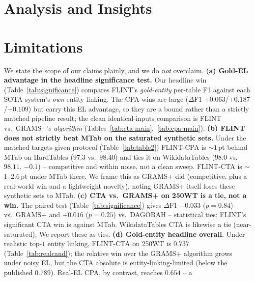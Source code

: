 \documentclass[11pt]{article}
\begin{document}
\section{Analysis and Insights}
\label{sec:analysis}





\section{Limitations}
\label{sec:limitations}
We state the scope of our claims plainly, and we do \emph{not} overclaim.
\textbf{(a) Gold-EL advantage in the headline significance test.} Our headline win
(Table~\ref{tab:significance}) compares FLINT's \emph{gold-entity} per-table F1 against
each SOTA system's \emph{own} entity linking. The CPA wins are large ($\Delta$F1
$+0.063$/$+0.187$/$+0.109$) but carry this EL advantage, so they are a bound rather
than a strictly matched pipeline result; the clean identical-inputs comparison is
FLINT vs.\ GRAMS+'s \emph{algorithm} (Tables~\ref{tab:cta-main},~\ref{tab:cpa-main}).
\textbf{(b) FLINT does not strictly beat MTab on the saturated synthetic sets.} Under
the matched targets-given protocol (Table~\ref{tab:table2}) FLINT-CPA is $\sim$$1$\,pt
behind MTab on HardTables ($97.3$ vs.\ $98.40$) and ties it on WikidataTables ($98.0$
vs.\ $98.11$, $-0.1$) -- competitive and within noise, not a clean sweep. FLINT-CTA is
$\sim$$1$--$2.6$\,pt under MTab there. We frame this as GRAMS+ did (competitive, plus a
real-world win and a lightweight novelty), noting GRAMS+ itself loses these synthetic
sets to MTab.
\textbf{(c) CTA vs.\ GRAMS+ on 250WT is a tie, not a win.} The paired test
(Table~\ref{tab:significance}) gives $\Delta$F1 $-0.033$ ($p{=}0.84$) vs.\ GRAMS+ and
$+0.016$ ($p{=}0.25$) vs.\ DAGOBAH -- statistical ties; FLINT's significant CTA win is
against MTab. WikidataTables CTA is likewise a tie (near-saturated). We report these as
ties.
\textbf{(d) Gold-entity headline overall.} Under realistic top-$1$ entity linking,
FLINT-CTA on 250WT is $0.737$ (Table~\ref{tab:realcand}); the relative win over the
GRAMS+ algorithm grows under noisy EL, but the CTA absolute is entity-linking-limited
(below the published $0.789$). Real-EL CPA, by contrast, reaches $0.654$ -- a
\end{document}
